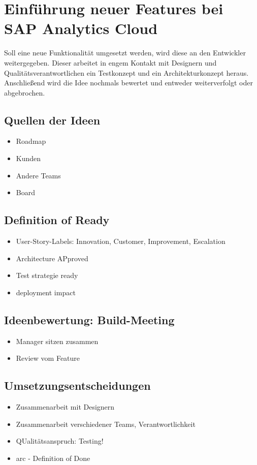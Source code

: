 \section{Einführung neuer Features bei SAP Analytics Cloud}\label{sec:feature}
Soll eine neue Funktionalität umgesetzt werden, wird diese an den Entwickler weitergegeben. Dieser 
arbeitet in engem Kontakt mit Designern und Qualitätsverantwortlichen ein Testkonzept und ein Architekturkonzept heraus. 
Anschließend wird die Idee nochmals bewertet und entweder weiterverfolgt oder abgebrochen. 

\subsection{Quellen der Ideen}
\begin{itemize}
    \item Roadmap
    \item Kunden
    \item Andere Teams 
    \item Board
\end{itemize}
\subsection{Definition of Ready}
\begin{itemize}
    \item User-Story-Labels: Innovation, Customer, Improvement, Escalation
    \item Architecture APproved
    \item Test strategie ready 
    \item deployment impact 
\end{itemize}
\subsection{Ideenbewertung: Build-Meeting}
\begin{itemize}
    \item Manager sitzen zusammen 
    \item Review vom Feature
\end{itemize}
\subsection{Umsetzungsentscheidungen}
\begin{itemize}
    \item Zusammenarbeit mit Designern
    \item Zusammenarbeit verschiedener Teams, Verantwortlichkeit
    \item QUalitätsanspruch: Testing! 
    \item \ac{arc} - Definition of Done
\end{itemize}